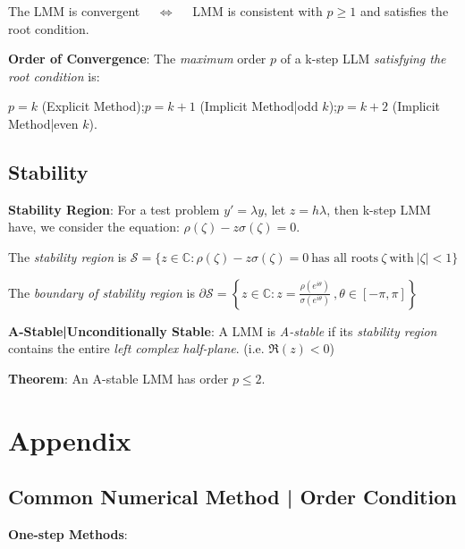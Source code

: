 \documentclass[9pt]{article}
\begin{document}
\quad The LMM is convergent \ \ $\Leftrightarrow$ \ \ LMM is consistent with $p\geq1$ and satisfies the root condition.


\textbf{Order of Convergence}: The \textit{maximum} order $p$ of a k-step LLM \textit{satisfying the root condition} is:

\quad $p=k$ (Explicit Method);\quad $p=k+1$ (Implicit Method|odd $k$);\quad $p=k+2$ (Implicit Method|even $k$).


\subsection{Stability}

\textbf{Stability Region}: For a test problem $y'=\lambda y$, let $z=h\lambda$, then k-step LMM have, we consider the equation: $\rho(\zeta)-z\sigma(\zeta)=0$.

\quad The \textit{stability region} is $\mathcal{S}=\{ z\in\mathbb{C}:\rho(\zeta)-z\sigma(\zeta)=0 \ \text{has all roots} \ \zeta \ \text{with} \ |\zeta|<1 \}$

\quad The \textit{boundary of stability region} is $\partial\mathcal{S}=\left\{ z\in\mathbb{C}: z=\frac{\rho(e^{i\theta})}{\sigma(e^{i\theta})} \ , \theta\in[-\pi,\pi] \right\}$

\textbf{A-Stable|Unconditionally Stable}: A LMM is \textit{A-stable} if its \textit{stability region} contains the entire \textit{left complex half-plane}. {\scriptsize (i.e. $\Re(z)<0$)}

\textbf{Theorem}: An A-stable LMM has order $p\leq 2$.

\newpage


\section{Appendix} 

\subsection{Common Numerical Method | Order Condition} %

\textbf{One-step Methods}:
\end{document}
